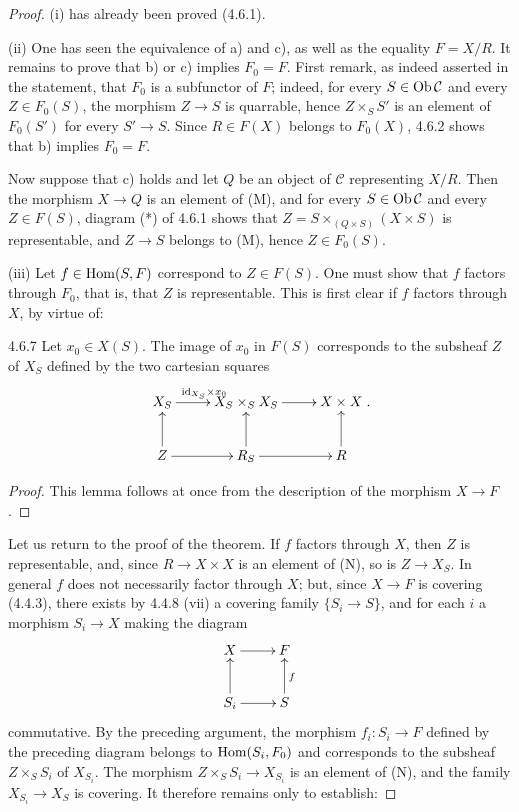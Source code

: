\begin{proof}
(i) has already been proved (4.6.1).

(ii) One has seen the equivalence of a) and c), as well as the
equality \(F=X/R\). It remains to prove that b) or c) implies
\(F_0=F\). First remark, as indeed asserted in the statement,
that \(F_0\) is a subfunctor of \(F\); indeed, for every
\(S\in\operatorname{Ob}\mathcal C\) and every \(Z\in F_0(S)\), the
morphism \(Z\to S\) is quarrable, hence
\(Z\times_S S'\) is an element of \(F_0(S')\) for every
\(S'\to S\). Since \(R\in F(X)\) belongs to \(F_0(X)\),
4.6.2 shows that b) implies \(F_0=F\).

Now suppose that c) holds and let \(Q\) be an object of
\(\mathcal C\) representing \(X/R\).
Then the morphism \(X\to Q\) is an element of (M), and for
every \(S\in\operatorname{Ob}\mathcal C\) and every \(Z\in F(S)\),
diagram (*) of 4.6.1 shows that
\(Z=S\times_{(Q\times S)}(X\times S)\) is representable,
and \(Z\to S\) belongs to (M), hence \(Z\in F_0(S)\).

(iii) Let \(f\in\operatorname{Hom}(S,F)\) correspond to \(Z\in F(S)\).
One must show that \(f\) factors through \(F_0\), that is,
that \(Z\) is representable. This is first clear if \(f\)
factors through \(X\), by virtue of:

\begin{lemma}{4.6.7}\label{IV.4.6.7}
Let \(x_0\in X(S)\). The image of \(x_0\) in \(F(S)\)
corresponds to the subsheaf \(Z\) of \(X_S\) defined by
the two cartesian squares
\[
\xymatrix{
X_S\ar[r]^{\mathrm{id}_{X_S}\times x_0}
 & X_S\times_S X_S\ar[r] & X\times X\\
Z\ar[u]\ar[r] & R_S\ar[u]\ar[r] & R\ar[u] }.
\]
\end{lemma}
\begin{proof}
This lemma follows at once from the description of the
morphism \(X\to F\).
\end{proof}
Let us return to the proof of the theorem.
If \(f\) factors through \(X\), then \(Z\) is representable,
and, since \(R\to X\times X\) is an element of (N),
so is \(Z\to X_S\).
In general \(f\) does not necessarily factor through \(X\);
but, since \(X\to F\) is covering (4.4.3), there exists by
4.4.8 (vii) a covering family \(\{S_i\to S\}\), and for
each \(i\) a morphism \(S_i\to X\) making the diagram
\[
\xymatrix{X\ar[r] & F\\ S_i\ar[u]\ar[r] & S\ar[u]_f }
\]
commutative.
By the preceding argument, the morphism \(f_i:S_i\to F\)
defined by the preceding diagram belongs to \(\operatorname{Hom}(S_i,F_0)\)
and corresponds to the subsheaf \(Z\times_S S_i\) of \(X_{S_i}\).
The morphism \(Z\times_S S_i\to X_{S_i}\) is an element of (N),
and the family \(X_{S_i}\to X_S\) is covering.
It therefore remains only to establish:


\end{proof}

